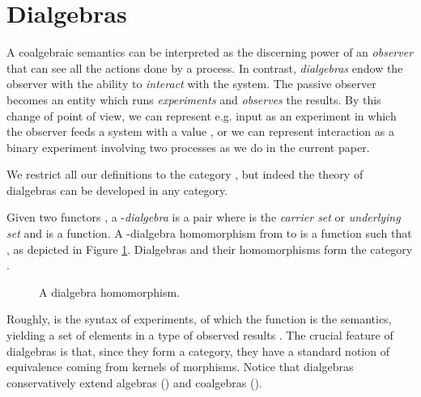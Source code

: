 \documentclass[orivec]{llncs}
\newcommand{\obj}[3]{\node (#1) [#2] {};}
\newcommand{\arr}[3]{\path[->,font=\scriptsize](#2) edge node[auto] {} (#3);}
\newcommand{\mF}[1]{\mathtt{#1}}
\newcommand{\F}{\mF{F}}
\newcommand{\B}{\mF{B}}
\newcommand{\defend}{}
\renewenvironment{definition}{\begin{defn}}{\defend\end{defn}}
\begin{document}
\section{Dialgebras}
\label{sec:dialgebras}

A coalgebraic semantics can be interpreted as the discerning power of an \emph{observer} that can see all the actions done by a process. In contrast,  \emph{dialgebras} endow the observer with the ability to \emph{interact} with the system. The passive observer becomes an entity which runs \emph{experiments} and \emph{observes} the results. By this change of point of view, we can represent e.g. input as an experiment in which the observer feeds a system with a value \cite{Cia11}, or we can represent interaction as a binary experiment involving two processes as we do in the current paper.

We restrict all our definitions to the category , but indeed the theory of dialgebras can be developed in any category.

\begin{definition}\label{def:dialgebra} Given two functors , a -\emph{dialgebra} is a pair  where  is the \emph{carrier set} or \emph{underlying set} and  is a function. A -dialgebra homomorphism from  to  is a function  such that , as depicted in Figure \ref{fig:dialgebra-homomorphism}. Dialgebras and their homomorphisms form the category .
\end{definition}

\begin{figure}
	\begin{center}
	\end{center}
	\caption{A dialgebra homomorphism.} \label{fig:dialgebra-homomorphism}
\end{figure}



Roughly,  is the syntax of experiments, of which the function  is the semantics, yielding a set of elements in a type of observed results . The crucial feature of dialgebras is that, since they form a category, they have a standard notion of equivalence coming from kernels of morphisms. Notice that dialgebras conservatively extend algebras () and coalgebras ().
\end{document}
